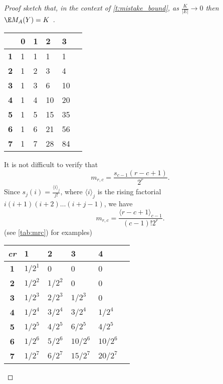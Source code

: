 \begin{proof}[Proof sketch that, in the context of \autoref{t:mistake_bound}, as $\frac{K}{|E|}
  \rightarrow 0$ then $\E M_A(Y)=K$  ]
\begin{center}
  \begin{tabular}{|c |M{.45cm}|M{.45cm}|M{.45cm}|M{.45cm}|N}
    \hline
     & \textbf{0}& \textbf{1} & \textbf{2} & \textbf{3}    &\\[13pt] \hline
    \textbf{1} & 1 & 1 & 1 & 1  &\\[13pt] \hline
    \textbf{2} & 1 & 2 & 3 & 4 &\\[13pt] \hline
    \textbf{3} & 1 & 3 & 6 & 10 &\\[13pt] \hline
    \textbf{4} & 1 & 4 & 10 & 20 &\\[13pt] \hline
    \textbf{5} & 1 & 5 & 15 & 35 &\\[13pt] \hline
    \textbf{6} & 1 & 6 & 21 & 56 &\\[13pt] \hline
    \textbf{7} & 1 & 7 & 28 & 84 &\\[13pt] \hline
  \end{tabular}
   \label{tab:sij} 
\end{center}

It is not difficult to verify that 
\[
m_{r,c}=\frac{s_{c-1}(r-c+1)}{2^{r}}. 
\]
Since $s_j(i)=\frac{\langle i\rangle_j}{j!}$, where $\langle i\rangle_j$ is the rising factorial
$i(i+1)(i+2)\ldots(i+j-1)$, we have 
\[
m_{r,c}=\frac{\langle r-c+1\rangle_{c-1}}{(c-1)!2^{r}}.
\] 
(see \autoref{tab:mrc}) for examples)


\begin{center}
  \begin{tabular}{|c |M{.77cm}|M{.77cm}|M{.77cm}|M{.77cm}|N}
    \hline
    {{\footnotesize \textit{\textbf{c}}}}{{\footnotesize \textit{\textbf{r}}}}
               & \textbf{1} & \textbf{2} & \textbf{3} & \textbf{4} &  \\ [13pt] \hline
    \textbf{1} & $1/2^1$    & 0          & 0          & 0          &  \\ [13pt] \hline
    \textbf{2} & $1/2^2$    & $1/2^2$    & 0          & 0          &  \\ [13pt] \hline
    \textbf{3} & $1/2^3$    & $2/2^3$    & $1/2^3$    & 0          &  \\ [13pt] \hline
    \textbf{4} & $1/2^4$    & $3/2^4$    & $3/2^4$    & $1/2^4$    &  \\ [13pt] \hline
    \textbf{5} & $1/2^5$    & $4/2^5$    & $6/2^5$    & $4/2^5$    &  \\ [13pt] \hline
    \textbf{6} & $1/2^6$    & $5/2^6$    & $10/2^6$   & $10/2^6$   &  \\ [13pt] \hline
    \textbf{7} & $1/2^7$    & $6/2^7$    & $15/2^7$   & $20/2^7$   &  \\ [13pt] \hline
  \end{tabular}
  \label{tab:mrc} 
\end{center}


\end{proof}
